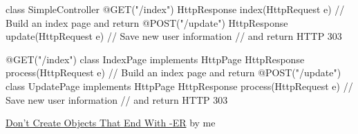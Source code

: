 \documentclass{article}
\begin{document}
\begin{pptWide}{2}
{\small\begin{ffcode}
class SimpleController {
  @GET("/index")
  HttpResponse index(HttpRequest e) {
    // Build an index page and return
  }
  @POST("/update")
  HttpResponse update(HttpRequest e) {
    // Save new user information
    // and return HTTP 303
  }
}
\end{ffcode}
}
\par\columnbreak\par
{\small\begin{ffcode}
@GET("/index")
class IndexPage implements HttpPage {
  HttpResponse process(HttpRequest e) {
    // Build an index page and return
  }
}
@POST("/update")
class UpdatePage implements HttpPage {
  HttpResponse process(HttpRequest e) {
    // Save new user information
    // and return HTTP 303
  }
}
\end{ffcode}
}
\end{pptWide}
\par
\plush{}


\href{https://www.yegor256.com/2015/03/09/objects-end-with-er.html}{Don't Create Objects That End With -ER} by me
\end{document}
